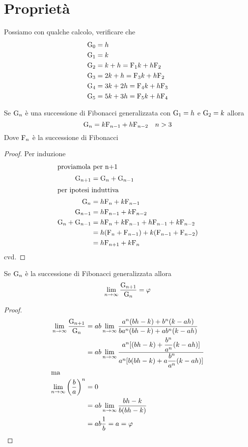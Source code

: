 \section{Proprietà}
Possiamo con qualche calcolo, verificare che
\begin{align*}
\mathrm{G}_{0}={}&h\\
\mathrm{G}_{1}={}&k\\
\mathrm{G}_{2}={}&k+h=\mathrm{F}_{1}k+h\mathrm{F}_{2}\\
\mathrm{G}_{3}={}&2k+h=\mathrm{F}_{3}k+h\mathrm{F}_{2}\\
\mathrm{G}_{4}={}&3k+2h=\mathrm{F}_{4}k+h\mathrm{F}_{3}\\
\mathrm{G}_{5}={}&5k+3h=\mathrm{F}_{5}k+h\mathrm{F}_{4}
\end{align*} 
\begin{thm}[Derivazione]
	Se $\mathrm{G}_{n}$ è una successione di Fibonacci generalizzata  con $\mathrm{G}_{1}=h$ e $\mathrm{G}_{2}=k $ allora
	\begin{equation}
		\mathrm{G}_{n}=k\mathrm{F}_{n-1}+h\mathrm{F}_{n-2}\quad n>3
	\end{equation}\label{thm:FibGenDer}
	Dove $\mathrm{F}_{n}$ è la successione di Fibonacci
\end{thm}
\begin{proof}
Per induzione
\begin{align*}
\intertext{proviamola per n+1}
		\mathrm{G}_{n+1}={}&\mathrm{G}_{n}+\mathrm{G}_{n-1}\\
\intertext{per ipotesi induttiva}
\mathrm{G}_{n}={}&h\mathrm{F}_{n}+k\mathrm{F}_{n-1}\\
\mathrm{G}_{n-1}={}&h\mathrm{F}_{n-1}+k\mathrm{F}_{n-2}\\
\mathrm{G}_{n}+\mathrm{G}_{n-1}={}&h\mathrm{F}_{n}+k\mathrm{F}_{n-1}+h\mathrm{F}_{n-1}+k\mathrm{F}_{n-2}\\
={}&h(\mathrm{F}_{n}+\mathrm{F}_{n-1})+k(\mathrm{F}_{n-1}+\mathrm{F}_{n-2})\\
={}&h\mathrm{F}_{n+1}+k\mathrm{F}_{n}\\
\end{align*}
cvd.
\end{proof}
\begin{thm}
	Se $\mathrm{G}_{n}$ è la successione di Fibonacci generalizzata allora 
	\begin{equation}
		\lim_{n\to\infty}\dfrac{\mathrm{G}_{n+1}}{\mathrm{G}_{n}}=\varphi
	\end{equation}\label{eqn:FibLimRapGen}
\end{thm}
\begin{proof}
	\begin{align*}
		\lim_{n\to\infty}\dfrac{\mathrm{G}_{n+1}}{\mathrm{G}_{n}}={}&ab\lim_{n\to\infty}\dfrac{a^n(bh-k)+b^n(k-ah)}{ba^n(bh-k)+ab^n(k-ah)}\\
		={}&ab\lim_{n\to\infty}\dfrac{a^n[(bh-k)+\dfrac{b^n}{a^n}(k-ah)]}{a^n[b(bh-k)+a\dfrac{b^n}{a^n}(k-ah)]}\\
		\intertext{ma}
	\lim_{n\to\infty}\left(\dfrac{b}{a}\right)^n={}&0\\
={}&ab\lim_{n\to\infty}\dfrac{bh-k}{b(bh-k)}\\
={}&ab\dfrac{1}{b}=a=\varphi\\
	\end{align*}
 \end{proof}
